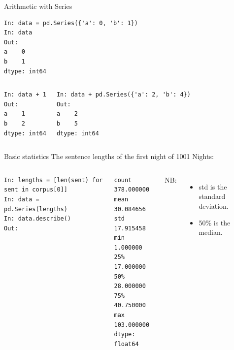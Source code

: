 \documentclass[aspectratio=169,usenames,dvipsnames]{beamer}
\begin{document}
\begin{frame}[fragile]{Arithmetic with Series}
\begin{lstlisting}
In: data = pd.Series({'a': 0, 'b': 1})
In: data
Out:
a    0
b    1
dtype: int64
\end{lstlisting}

\begin{columns}
\begin{lstlisting}
In: data + 1
Out:
a    1
b    2
dtype: int64
\end{lstlisting}

\pause{}
\begin{lstlisting}
In: data + pd.Series({'a': 2, 'b': 4})
Out:
a    2
b    5
dtype: int64
\end{lstlisting}
\end{columns}
\end{frame}

\begin{frame}[fragile]{Basic statistics}
The sentence lengths of the first night of 1001 Nights:
\begin{columns}
\begin{lstlisting}
In: lengths = [len(sent) for sent in corpus[0]]
In: data = pd.Series(lengths)
In: data.describe()
Out:
\end{lstlisting}
\begin{lstlisting}[style=plain]
count    378.000000
mean      30.084656
std       17.915458
min        1.000000
25%       17.000000
50%       28.000000
75%       40.750000
max      103.000000
dtype: float64
\end{lstlisting}
    NB:
    \begin{itemize}
        \item std is the standard deviation.
        \item 50\% is the median.
    \end{itemize}
\end{columns}
\end{frame}
\end{document}
